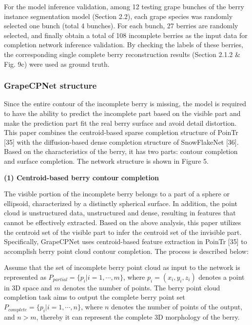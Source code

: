 \documentclass[12pt]{article}
\begin{document}
For the model inference validation, among 12 testing grape bunches of the berry instance segmentation model 
(Section 2.2), each grape species was randomly selected one bunch (total 4 bunches). 
For each bunch, 27 berries are randomly selected, and finally obtain a total of 108 incomplete berries as the input data for completion network inference validation. 
By checking the labels of these berries, the corresponding single complete berry reconstruction results %
(Section 2.1.2 \& Fig. 9c) were used as ground truth.

\subsubsection{GrapeCPNet structure}

Since the entire contour of the incomplete berry is missing, the model is required to have the ability to predict the incomplete part based on the visible part and make the prediction part fit the real berry surface and avoid detail distortion. 
This paper combines the centroid-based sparse completion structure of PoinTr [35] with the diffusion-based dense completion structure of SnowFlakeNet [36]. 
Based on the characteristics of the berry, it has two parts: contour completion and surface completion. The network structure is shown in Figure 5.


{\raggedright\textbf{(1) Centroid-based berry contour completion}}

The visible portion of the incomplete berry belongs to a part of a sphere or ellipsoid, characterized by a distinctly spherical surface. 
In addition, the point cloud is unstructured data, unstructured and dense, resulting in features that cannot be effectively extracted. 
Based on the above analysis, this paper utilizes the centroid set of the visible part to infer the centroid set of the invisible part. 
Specifically, GrapeCPNet uses centroid-based feature extraction in PoinTr [35] to accomplish berry point cloud contour completion. The process is described below: 

Assume that the set of incomplete berry point cloud as input to the network is represented as $P_{partial}=\{p_i | i=1, \cdots, m \}$, where $p_i=(x_i,y_i,z_i)$ denotes a point in 3D space and $m$ denotes the number of points. 
The berry point cloud completion task aims to output the complete berry point set $P_{complete}=\{p_i | i=1, \cdots, n\}$, where $n$ denotes the number of points of the output, and $n > m$, thereby it can represent the complete 3D morphology of the berry.
\end{document}
